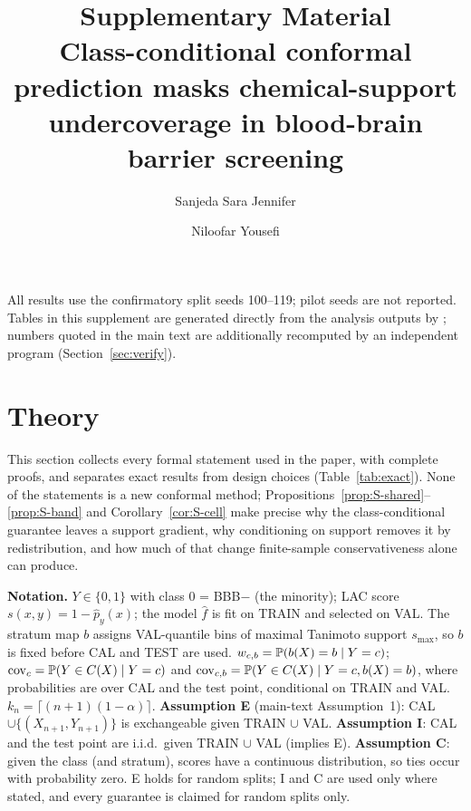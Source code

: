 \documentclass[10pt]{article}
\title{Supplementary Material\\[0.3em]\large Class-conditional conformal prediction masks chemical-support undercoverage in blood-brain barrier screening}
\author{Sanjeda Sara Jennifer \and Niloofar Yousefi}
\date{}
\begin{document}
\maketitle
\noindent All results use the confirmatory split seeds 100--119; pilot seeds are not reported. Tables in this supplement are generated directly from the analysis outputs by ; numbers quoted in the main text are additionally recomputed by an independent program (Section~\ref{sec:verify}).

\tableofcontents

\section{Theory}\label{sec:proofs}
This section collects every formal statement used in the paper, with complete proofs, and separates exact results from design choices (Table~\ref{tab:exact}). None of the statements is a new conformal method; Propositions~\ref{prop:S-shared}--\ref{prop:S-band} and Corollary~\ref{cor:S-cell} make precise why the class-conditional guarantee leaves a support gradient, why conditioning on support removes it by redistribution, and how much of that change finite-sample conservativeness alone can produce.

\textbf{Notation.} $Y\in\{0,1\}$ with class $0$ = BBB$-$ (the minority); LAC score $s(x,y)=1-\hat p_y(x)$; the model $\hat f$ is fit on TRAIN and selected on VAL. The stratum map $b$ assigns VAL-quantile bins of maximal Tanimoto support $s_{\max}$, so $b$ is fixed before CAL and TEST are used. $w_{c,b}=\mathbb{P}(b(X)=b\mid Y=c)$; $\mathrm{cov}_c=\mathbb{P}(Y\in C(X)\mid Y=c)$ and $\mathrm{cov}_{c,b}=\mathbb{P}(Y\in C(X)\mid Y=c,b(X)=b)$, where probabilities are over CAL and the test point, conditional on TRAIN and VAL. $k_n=\lceil(n+1)(1-\alpha)\rceil$.
\textbf{Assumption E} (main-text Assumption~1): CAL $\cup\{(X_{n+1},Y_{n+1})\}$ is exchangeable given TRAIN $\cup$ VAL. \textbf{Assumption I}: CAL and the test point are i.i.d.\ given TRAIN $\cup$ VAL (implies E). \textbf{Assumption C}: given the class (and stratum), scores have a continuous distribution, so ties occur with probability zero. E holds for random splits; I and C are used only where stated, and every guarantee is claimed for random splits only.
\end{document}

